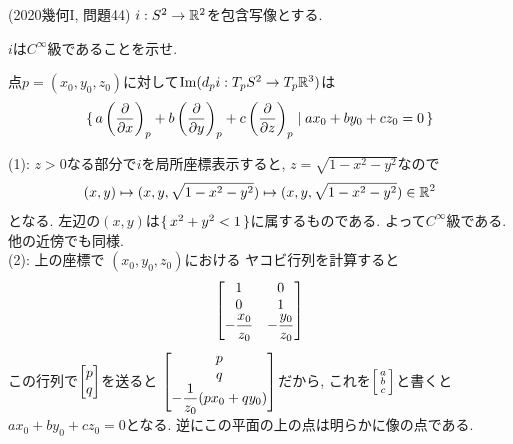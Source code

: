 \begin{egprob} (2020幾何I, 問題44)
$i:S^2\to \mathbb{R}^2$を包含写像とする.
\ben
\item $i$は$C^{\infty}$級であることを示せ.
\item 点$p=(x_0,y_0,z_0)$に対して$\mathrm{Im}(d_pi:T_p S^2 \to T_p\mathbb{R}^3)$は
\[\set{a\left( \dfrac{\partial}{\partial x} \right)_{p} + b\left( \dfrac{\partial}{\partial y} \right)_{p} + c\left( \dfrac{\partial}{\partial z} \right)_{p} \mid ax_0 + by_0 + cz_0 = 0}\]
\een
\end{egprob}
\begin{egans}
(1): $z>0$なる部分で$i$を局所座標表示すると, $z=\sqrt{1-x^2 - y^2}$なので
{\small
\[ (x,y)\mapsto (x,y,\sqrt{1-x^2-y^2}) \mapsto (x,y,\sqrt{1-x^2-y^2})\in \mathbb{R}^2\]
}となる. 左辺の$(x,y)$は$\set{x^2+y^2<1}$に属するものである. よって$C^{\infty}$級である. 他の近傍でも同様. \\
(2): 上の座標で $(x_0,y_0,z_0)$における ヤコビ行列を計算すると
\[
\begin{bmatrix}
1 & 0 \\ 0& 1 \\ -\dfrac{x_0}{z_0} & -\dfrac{y_0}{z_0}
\end{bmatrix}
\]
この行列で$\begin{bmatrix}p \\ q\end{bmatrix}$を送ると $\begin{bmatrix}p \\ q \\ -\dfrac{1}{z_0}(px_0 + qy_0)\end{bmatrix}$だから, これを$\left[\begin{smallmatrix}a\\ b\\ c\end{smallmatrix}\right]$と書くと$ax_0 + by_0 + cz_0 = 0$となる. 逆にこの平面の上の点は明らかに像の点である.
\end{egans}


